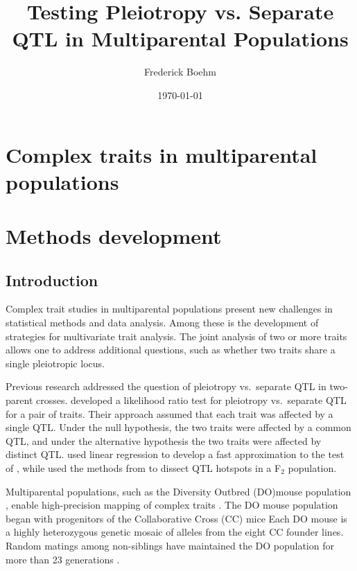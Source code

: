 \documentclass{book}
\title{Testing Pleiotropy vs. Separate QTL in Multiparental Populations}
\author{Frederick Boehm}
\date{\today}
\begin{document}
\doublespacing
\maketitle
\tableofcontents

\chapter{Complex traits in multiparental populations}


\chapter{Methods development}

\section{Introduction}

Complex trait studies in multiparental populations present new
challenges in statistical methods and data analysis. Among these is
the development of strategies for multivariate trait analysis. The
joint analysis of two or more traits allows one to address additional
questions, such as whether two traits share a single pleiotropic
locus.




Previous research addressed the question of pleiotropy vs.\ separate
QTL in two-parent crosses.
\citet{jiang1995multiple} developed a likelihood
ratio test for pleiotropy vs.\ separate QTL for a pair of traits.
Their approach assumed that each trait was affected by a single QTL.
Under the null hypothesis, the two traits were affected by a common
QTL, and under the alternative hypothesis the two traits were affected
by distinct QTL.
\citet{knott2000multitrait} used linear regression to develop a fast
approximation to the test of \citet{jiang1995multiple}, while
\citet{tian2016dissection} used the methods from
\citet{knott2000multitrait} to dissect QTL hotspots in a F$_2$
population.




Multiparental populations, such
as the Diversity Outbred (DO)mouse population \citep{churchill2012diversity}, enable high-precision
mapping of complex traits \citep{de2014genetics}. The DO
mouse population began with progenitors of the Collaborative
Cross (CC) mice \citep{churchill2004collaborative}
Each DO mouse is a highly heterozygous genetic mosaic
of alleles from the eight CC founder lines. Random
matings among non-siblings have maintained the DO
population for more than 23 generations \citep{chesler2016diversity}.
\end{document}
